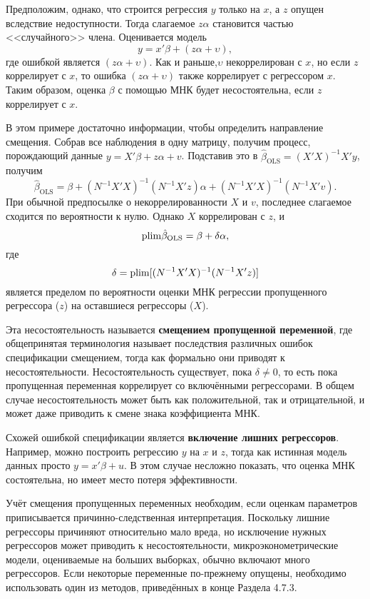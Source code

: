Предположим, однако, что строится регрессия $y$  только на $x$, а $z$ опущен вследствие недоступности. Тогда слагаемое $z\alpha$ становится частью <<случайного>> члена. Оценивается модель
\begin{equation}
y = x'\beta + (z\alpha + \upsilon),
\end{equation}
где ошибкой является $(z\alpha + \upsilon)$. Как и раньше,$\upsilon$  некоррелирован с $x$, но если $z$ коррелирует с $x$, то ошибка $(z\alpha + \upsilon)$  также коррелирует с регрессором $x$. Таким образом, оценка $\beta$ с помощью МНК будет несостоятельна, если $z$ коррелирует с $x$.

В этом примере достаточно информации, чтобы определить направление смещения. Собрав все наблюдения в одну матрицу, получим процесс, порождающий данные $y = X'\beta +z\alpha + v$. Подставив это в $\hat{\beta}_{\text{OLS}} = (X'X)^{-1}X'y$, получим
$$
\hat{\beta}_{\text{OLS}} = \beta + (N^{-1}X'X)^{-1} (N^{-1}X'z)\alpha + (N^{-1}X'X)^{-1} (N^{-1}X'v).
$$
При обычной предпосылке о некоррелированности $X$ и $v$, последнее слагаемое сходится по вероятности к нулю. Однако $X$ коррелирован с $z$, и 
\begin{equation}
\mathrm{plim } \hat{\beta}_{\text{OLS}} = \beta +\delta \alpha,
\end{equation}
где 
$$
\delta = \mathrm{plim } [(N^{-1}X'X)^{-1} (N^{-1}X'z)]
$$
является пределом по вероятности оценки МНК регрессии пропущенного регрессора ($z$) на оставшиеся регрессоры ($X$).

Эта несостоятельность называется \textbf{смещением пропущенной переменной}, где общепринятая терминология называет последствия различных ошибок спецификации смещением, тогда как формально они приводят к несостоятельности. Несостоятельность существует, пока $\delta \neq 0$, то есть пока пропущенная переменная коррелирует со включёнными регрессорами. В общем случае несостоятельность может быть как положительной, так и отрицательной, и может даже приводить к смене знака коэффициента МНК.

Схожей ошибкой спецификации является \textbf{включение лишних регрессоров}. Например, можно построить регрессию $y$  на $x$ и $z$, тогда как истинная модель данных просто $y = x'\beta +u$. В этом случае несложно показать, что оценка МНК состоятельна, но имеет место потеря эффективности. 

Учёт смещения пропущенных переменных необходим, если оценкам параметров приписывается причинно-следственная интерпретация. Поскольку лишние регрессоры причиняют относительно мало вреда, но исключение нужных регрессоров может приводить к несостоятельности, микроэконометрические модели, оцениваемые на больших выборках, обычно включают много регрессоров. Если некоторые переменные по-прежнему опущены, необходимо использовать один из методов, приведённых в конце Раздела 4.7.3.

